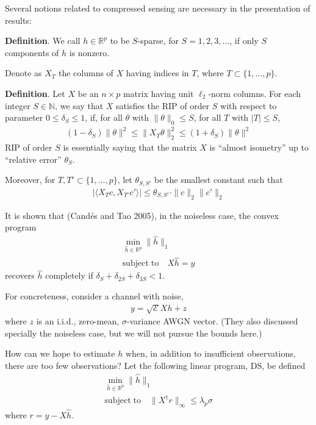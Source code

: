 \documentclass[12pt]{article}
\begin{document}
Several notions related to compressed sensing are necessary in the presentation of results:

\textbf{Definition}. We call \(h \in \mathbb{R}^p\) to be \(S\)-sparse, for \(S =1,2,3,\dotsc\), if only \(S\) components of \(h\) is nonzero.


Denote as \(X_T\) the columns of \(X\) having indices in \(T\), where \(T \subset \{1,\dotsc,p\}\).

\textbf{Definition}.
Let \(X\) be an \(n \times p\) matrix having unit \(\ell_2\)-norm columns.
For each integer \(S \in \mathbb{N}\), we say that \(X\) satisfies the RIP of order \(S\) with respect to parameter \(0 \leq \delta_S \leq 1\), if, for all \(\theta\) with \(\|\theta\|_0 \leq S\), for all \(T\) with \(|T| \leq S\),
\begin{gather*}
(1-\delta_S) \|\theta\|^2
\leq \|X_T \theta\|_2^2
\leq (1+\delta_S) \|\theta\|^2
\end{gather*}
RIP of order \(S\) is essentially saying that the matrix \(X\) is ``almost isometry'' up to ``relative error'' \(\theta_S\).

Moreover, for \(T,T' \subset \{1, \dotsc, p \}\), let \(\theta_{S,S'}\) be the smallest constant such that
\begin{gather*}
| \langle X_T c, X_{T'} c' \rangle |
\leq \theta_{S,S'} \cdot \| c \|_2 \|c'\|_2
\end{gather*}


It is shown that (Cand\'es and Tao 2005), in the noiseless case, the convex program
\begin{gather*}
\min_{\hat{h} \in \mathbb{R}^p}  \|\hat{h}\|_1 \\
\mathrm{subject}\; \mathrm{to} \quad X \hat{h} =y
\end{gather*}
recovers \(\hat{h}\) completely if \(\delta_{S} +\delta_{2S} +\delta_{3S} <1\).


For concreteness, consider a channel with noise,
\begin{gather*}
y =\sqrt{\mathcal{E}} X h +z
\end{gather*}
where \(z\) is an i.i.d., zero-mean, \(\sigma\)-variance AWGN vector.
(They also discussed specially the noiseless case, but we will not pursue the bounds here.)



How can we hope to estimate \(h\) when, in addition to insufficient observations, there are too few observations?
Let the following linear program, DS, be defined
\begin{gather*}
\min_{\hat{h} \in \mathbb{R}^p}  \|\hat{h}\|_1 \\
\mathrm{subject}\; \mathrm{to} \quad \|X^\dagger r\|_\infty \leq \lambda_p \sigma
\end{gather*}
where \(r =y -X \hat{h}\).
\end{document}
